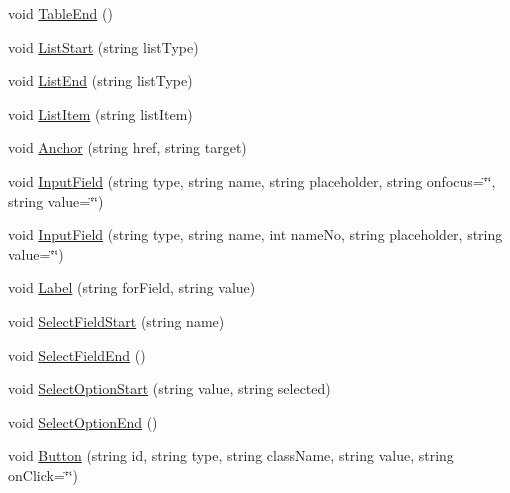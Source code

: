 \begin{DoxyCompactItemize}
\item 
void \hyperlink{classPageStructureMaker_a7f8fefbe7a825c1b7761fc8a0f1bb8e4}{Table\-End} ()
\item 
void \hyperlink{classPageStructureMaker_ac24ce26202757aaa30402155daf8a3d0}{List\-Start} (string list\-Type)
\item 
void \hyperlink{classPageStructureMaker_a8578b1555ad2fc92a9efc7dbf7d1fe87}{List\-End} (string list\-Type)
\item 
void \hyperlink{classPageStructureMaker_adf4116e526026edc3c8a3bcf96a7e929}{List\-Item} (string list\-Item)
\item 
void \hyperlink{classPageStructureMaker_a8c0fae5b599182863066de56ae0cea42}{Anchor} (string href, string target)
\item 
void \hyperlink{classPageStructureMaker_a5e5876babd4602e5c799d3f551c7b779}{Input\-Field} (string type, string name, string placeholder, string onfocus=\char`\"{}\char`\"{}, string value=\char`\"{}\char`\"{})
\item 
void \hyperlink{classPageStructureMaker_af528f8da142cbc47585c4dfeded873ba}{Input\-Field} (string type, string name, int name\-No, string placeholder, string value=\char`\"{}\char`\"{})
\item 
void \hyperlink{classPageStructureMaker_ae85f66489db9a65682bb9a2c2128f433}{Label} (string for\-Field, string value)
\item 
void \hyperlink{classPageStructureMaker_ae8684bb66ca463e2f92e09c96137f9e3}{Select\-Field\-Start} (string name)
\item 
void \hyperlink{classPageStructureMaker_a81eb3cdbc840a4c8165cef87330ade09}{Select\-Field\-End} ()
\item 
void \hyperlink{classPageStructureMaker_a77856078e74dab25329132ea07466f92}{Select\-Option\-Start} (string value, string selected)
\item 
void \hyperlink{classPageStructureMaker_a7682f479f7f1012d426ec9f9535def60}{Select\-Option\-End} ()
\item 
void \hyperlink{classPageStructureMaker_a53c013b1d6251be853be8f6c413e3455}{Button} (string id, string type, string class\-Name, string value, string on\-Click=\char`\"{}\char`\"{})
\end{DoxyCompactItemize}
